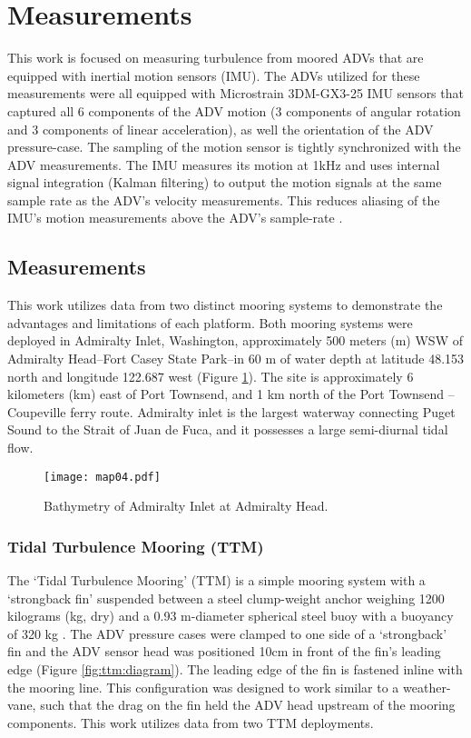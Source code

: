 
\section{Measurements}
\label{sec:meas}

This work is focused on measuring turbulence from moored ADVs that are equipped with inertial motion sensors (IMU). The ADVs utilized for these measurements were all equipped with Microstrain 3DM-GX3-25 IMU sensors that captured all 6 components of the ADV motion (3 components of angular rotation and 3 components of linear acceleration), as well the orientation of the ADV pressure-case. The sampling of the motion sensor is tightly synchronized with the ADV measurements. The IMU measures its motion at 1kHz and uses internal signal integration (Kalman filtering) to output the motion signals at the same sample rate as the ADV's velocity measurements. This reduces aliasing of the IMU's motion measurements above the ADV's sample-rate \citep[]{3DM-GX3_coning_sculling}.

\subsection{Measurements}

This work utilizes data from two distinct mooring systems to demonstrate the advantages and limitations of each platform. Both mooring systems were deployed in Admiralty Inlet, Washington, approximately 500 meters (m) WSW of Admiralty Head--Fort Casey State Park--in 60 m of water depth at latitude 48.153 north and longitude 122.687 west (Figure \ref{fig:map}). The site is approximately 6 kilometers (km) east of Port Townsend, and 1 km north of the Port Townsend -- Coupeville ferry route.  
Admiralty inlet is the largest waterway connecting Puget Sound to the Strait of Juan de Fuca, and it possesses a large semi-diurnal tidal flow.

\begin{figure}[t]
  \centering
  \texttt{[image: map04.pdf]}
  \caption{Bathymetry of Admiralty Inlet at Admiralty Head.}
  \label{fig:map}
\end{figure}

\subsubsection{Tidal Turbulence Mooring (TTM)}

The `Tidal Turbulence Mooring' (TTM) is a simple mooring system with a `strongback fin' suspended between a steel clump-weight anchor weighing 1200 kilograms (kg, dry) and a 0.93 m-diameter spherical steel buoy with a buoyancy of 320 kg . The ADV pressure cases were clamped to one side of a `strongback' fin and the ADV sensor head was positioned 10cm in front of the fin's leading edge (Figure \ref{fig:ttm:diagram}). The leading edge of the fin is fastened inline with the mooring line. This configuration  was designed to work similar to a weather-vane, such that the drag on the fin held the ADV head upstream of the mooring components.  This work utilizes data from two TTM deployments. 

